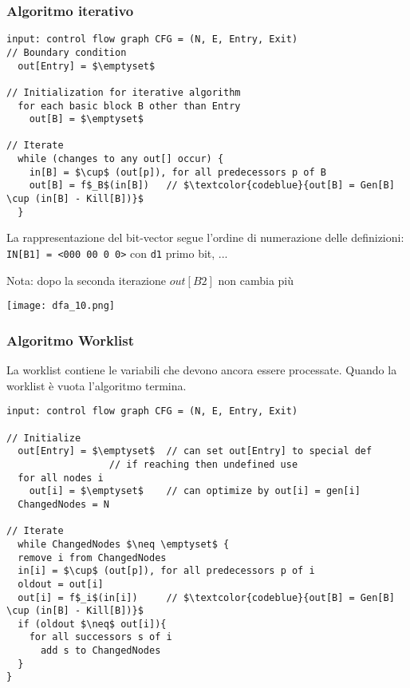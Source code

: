 \subsubsection{Algoritmo iterativo}

\begin{lstlisting}
input: control flow graph CFG = (N, E, Entry, Exit)
// Boundary condition
  out[Entry] = $\emptyset$

// Initialization for iterative algorithm
  for each basic block B other than Entry
    out[B] = $\emptyset$

// Iterate
  while (changes to any out[] occur) {
    in[B] = $\cup$ (out[p]), for all predecessors p of B
    out[B] = f$_B$(in[B])   // $\textcolor{codeblue}{out[B] = Gen[B] \cup (in[B] - Kill[B])}$
  }\end{lstlisting}

\begin{example}[frametitle={Esempio di eseguzione}]
    \noindent\begin{minipage}[c]{.45\textwidth}
    \begin{emphasize-blue}
      La rappresentazione del bit-vector segue l'ordine di numerazione delle definizioni: \lstinline|IN[B1] = <000 00 0 0>| con \lstinline|d1| primo bit, ...
    \end{emphasize-blue}
    
    Nota: dopo la seconda iterazione $out[B2]$ non cambia pi\`u
    \end{minipage}
  \begin{minipage}[c]{.55\textwidth}
  \texttt{[image: dfa\_10.png]}
  \end{minipage}
\end{example}

\subsubsection{Algoritmo Worklist}

La worklist contiene le variabili che devono ancora essere processate. Quando la worklist \`e vuota l'algoritmo termina.
  
\begin{lstlisting}
input: control flow graph CFG = (N, E, Entry, Exit)

// Initialize
  out[Entry] = $\emptyset$  // can set out[Entry] to special def
                  // if reaching then undefined use
  for all nodes i
    out[i] = $\emptyset$    // can optimize by out[i] = gen[i]
  ChangedNodes = N

// Iterate
  while ChangedNodes $\neq \emptyset$ {
  remove i from ChangedNodes
  in[i] = $\cup$ (out[p]), for all predecessors p of i
  oldout = out[i]
  out[i] = f$_i$(in[i])     // $\textcolor{codeblue}{out[B] = Gen[B] \cup (in[B] - Kill[B])}$
  if (oldout $\neq$ out[i]){
    for all successors s of i
      add s to ChangedNodes
  }
}\end{lstlisting}

